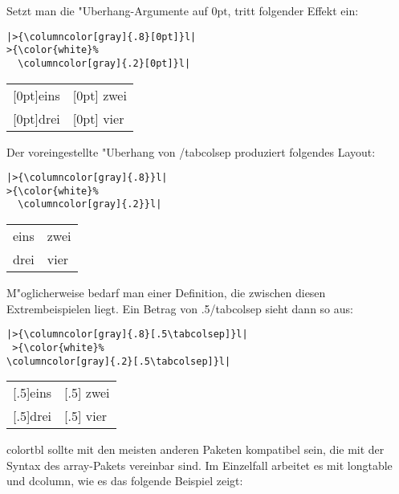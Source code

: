 \documentclass[ngerman]{article}
\begin{document}
Setzt man die "Uberhang-Argumente auf $0 \textrm{pt}$, tritt folgender Effekt ein:
\begin{center}
\begin{minipage}{.75\textwidth}
\begin{verbatim}
|>{\columncolor[gray]{.8}[0pt]}l|
>{\color{white}%
  \columncolor[gray]{.2}[0pt]}l|
\end{verbatim}
\end{minipage}
{\bfseries
\begin{tabular}{%
|>{\columncolor[gray]{.8}[0pt]}l|
 >{\color{white}%
    \columncolor[gray]{.2}[0pt]}l|
  }
  eins & zwei\\
  drei & vier
 \end{tabular}}
 \end{center}
Der voreingestellte "Uberhang von \slash \textsf{tabcolsep} produziert folgendes Layout:
\begin{center}
\begin{minipage}{.75\textwidth}
\begin{verbatim}
|>{\columncolor[gray]{.8}}l|
>{\color{white}%
  \columncolor[gray]{.2}}l|
\end{verbatim}
\end{minipage}
 {\bfseries
 \begin{tabular}{%
   |>{\columncolor[gray]{.8}}l|
   >{\color{white}%
     \columncolor[gray]{.2}}l|
   }
  eins & zwei\\
  drei & vier
  \end{tabular}}
\end{center}
M"oglicherweise bedarf man einer Definition, die zwischen diesen Extrembeispielen liegt. 
Ein Betrag von .5\slash \textsf{tabcolsep} sieht dann so aus:

 \begin{center}
\begin{minipage}{.75\textwidth}
\begin{verbatim}
|>{\columncolor[gray]{.8}[.5\tabcolsep]}l|
 >{\color{white}%
\columncolor[gray]{.2}[.5\tabcolsep]}l|
\end{verbatim}
\end{minipage}
{\bfseries
\begin{tabular}{%
   |>{\columncolor[gray]{.8}[.5\tabcolsep]}l|
  >{\color{white}\columncolor[gray]{.2}[.5\tabcolsep]}l|
   }
  eins & zwei\\
  drei & vier
 \end{tabular}}
\end{center}

\textsf{colortbl} sollte mit den meisten anderen Paketen kompatibel sein, die mit der 
Syntax des \textsf{array}-Pakets vereinbar sind. Im Einzelfall arbeitet es mit 
\textsf{longtable} und \textsf{dcolumn}, wie es das folgende Beispiel zeigt:
\end{document}
